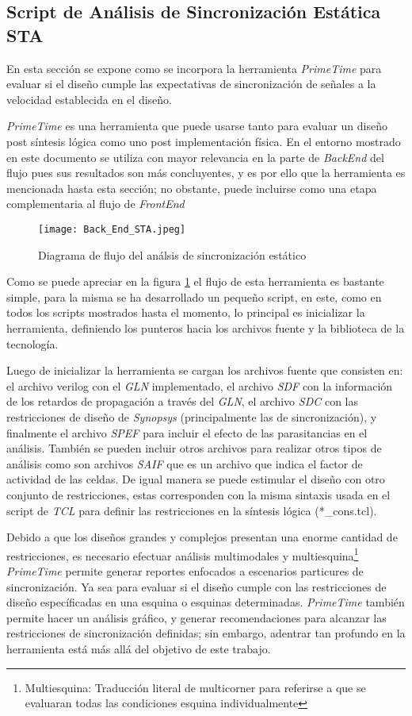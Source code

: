 \subsection{Script de Análisis de Sincronización Estática STA}
\label{sec:STA}

En esta sección se expone como se incorpora la herramienta \textit{PrimeTime} para evaluar si el diseño cumple las expectativas de sincronización de señales a la velocidad establecida en el diseño.

\textit{PrimeTime} es una herramienta que puede usarse tanto para evaluar un diseño post síntesis lógica como uno post implementación física. En el entorno mostrado en este documento se utiliza con mayor relevancia en la parte de \textit{BackEnd} del flujo pues sus resultados son más concluyentes, y es por ello que la herramienta es mencionada hasta esta sección; no obstante, puede incluirse como una etapa complementaria al flujo de \textit{FrontEnd}

\begin{figure}[ht]
\texttt{[image: Back\_End\_STA.jpeg]}
\caption{Diagrama de flujo del análsis de sincronización estático}
\label{fig:staflow}
\end{figure}

Como se puede apreciar en la figura \ref{fig:staflow} el flujo de esta herramienta es bastante simple, para la misma se ha desarrollado un pequeño script, en este, como en todos los scripts mostrados hasta el momento, lo principal es inicializar la herramienta, definiendo los punteros hacia los archivos fuente y la biblioteca de la tecnología.

Luego de inicializar la herramienta se cargan los archivos fuente que consisten en: el archivo verilog con el \textit{GLN} implementado, el archivo \textit{SDF} con la información de los retardos de propagación a través del \textit{GLN}, el archivo \textit{SDC} con las restricciones de diseño de \textit{Synopsys} (principalmente las de sincronización), y finalmente el archivo \textit{SPEF} para incluir el efecto de las parasitancias en el análisis. También se pueden incluir otros archivos para realizar otros tipos de análisis como son archivos \textit{SAIF} que es un archivo que indica el factor de actividad de las celdas. De igual manera se puede estimular el diseño con otro conjunto de restricciones, estas corresponden con la misma sintaxis usada en el script de \textit{TCL} para definir las restricciones en la síntesis lógica (*\_cons.tcl).

Debido a que los diseños grandes y complejos presentan una enorme cantidad de restricciones, es necesario efectuar análisis multimodales y multiesquina\footnote{Multiesquina: Traducción literal de multicorner para referirse a que se evaluaran todas las condiciones esquina individualmente} \textit{PrimeTime} permite generar reportes enfocados a escenarios particures de sincronización. Ya sea para evaluar si el diseño cumple con las restricciones de diseño específicadas en una esquina o esquinas determinadas. \textit{PrimeTime} también permite hacer un análisis gráfico, y generar recomendaciones para alcanzar las restricciones de sincronización definidas; sin embargo, adentrar tan profundo en la herramienta está más allá del objetivo de este trabajo.

